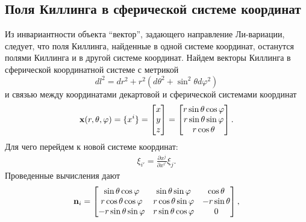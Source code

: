 \documentclass[12pt,a4paper]{article}
\begin{document}

    \subsection{Поля Киллинга в сферической системе координат}

        Из инвариантности объекта \enquote{вектор}, задающего направление Ли-вариации, следует, что поля Киллинга, найденные в одной системе координат, останутся полями Киллинга и в другой системе координат. Найдем векторы Киллинга в сферической координатной системе с метрикой
        \begin{equation}
            dl^2 = dr^2 + r^2 (d\theta^2 + \sin ^2 \theta d\varphi^2)
        \end{equation}
        и связью между координатами декартовой и сферической системами координат
        \begin{equation}
            \mathbf{x}(r, \theta, \varphi)
            =
            \{x^i\}
            =
            \begin{bmatrix}
                x \\ y \\ z
            \end{bmatrix}
            =
            \begin{bmatrix}
                r \sin\theta \cos\varphi \\
                r \sin\theta \sin\varphi \\
                r \cos\theta
            \end{bmatrix}
            .
        \end{equation}
        Для чего перейдем к новой системе координат:
        \begin{equation}\begin{aligned}
            \xi_{i'} = \frac{\partial x^j}{\partial x^{i'}} \xi_j.
        \end{aligned}\end{equation}
        Проведенные вычисления дают
        \begin{equation}
            \mathbf{n}_i
            =
            \begin{bmatrix}
                \sin\theta \cos\varphi     & \sin\theta \sin\varphi   & \cos\theta \\
                r \cos\theta \cos\varphi   & r \cos\theta \sin\varphi & - r \sin\theta \\
                - r \sin\theta \sin\varphi & r \sin\theta \cos\varphi & 0
            \end{bmatrix}
            ,
        \end{equation}
\end{document}
